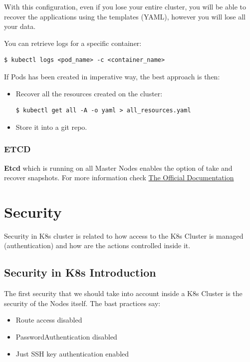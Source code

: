 \documentclass{article}
\newenvironment{blocktemplateII}[1]{%
    \tcolorbox[beamer,%
    noparskip,breakable,
    colframe=Green,%
    colbacklower=LimeGreen!75!LightGreen,%
    title=#1]}%
    {\endtcolorbox}
\newenvironment{codetemplate}[1][]{%
  \mybasecolorbox[#1]
  \itshape
}{%
  \endmybasecolorbox
}
\begin{document}
With this configuration, even if you lose your entire cluster, you will be able to recover the applications using the templates (YAML), however you will lose all your data.

You can retrieve logs for a specific container:
\begin{codetemplate}{}
\begin{verbatim}
$ kubectl logs <pod_name> -c <container_name>
\end{verbatim}
\end{codetemplate}

\begin{blocktemplateII}{NOTE}
If Pods has been created in imperative way, the best approach is then:
\begin{itemize}
    \item Recover all the resources created on the cluster:
\begin{codetemplate}{}
\begin{verbatim}
$ kubectl get all -A -o yaml > all_resources.yaml
\end{verbatim}
\end{codetemplate}

    \item Store it into a git repo.
\end{itemize}
\end{blocktemplateII}

\subsubsection{ETCD}
\textbf{Etcd} which is running on all Master Nodes enables the option of take and recover snapshots. For more information check \href{https://kubernetes.io/docs/tasks/administer-cluster/configure-upgrade-etcd/}{The Official Documentation}

\newpage
\section{Security}

Security in K8s cluster is related to how access to the K8s Cluster is managed (authentication) and how are the actions controlled inside it.


\subsection{Security in K8s Introduction}
The first security that we should take into account inside a K8s Cluster is the security of the Nodes itself. The bast practices say:
\begin{itemize}
    \item Route access disabled
    \item PasswordAuthentication disabled
    \item Just SSH key authentication enabled
\end{itemize}
\end{document}
